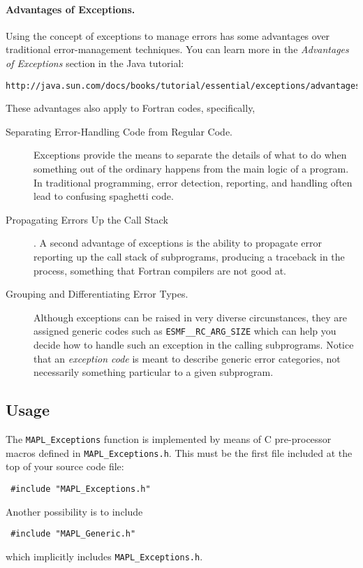\paragraph{Advantages of Exceptions.} Using the concept of exceptions
to manage errors has some advantages over traditional error-management
techniques. You can learn more in the {\em Advantages of Exceptions}
section in the Java tutorial:
\begin{verbatim}
http://java.sun.com/docs/books/tutorial/essential/exceptions/advantages.html
\end{verbatim}
These advantages also apply to Fortran codes, specifically,
\begin{description}

\item[Separating Error-Handling Code from Regular Code.] Exceptions
  provide the means to separate the details of what to do when
  something out of the ordinary happens from the main logic of a
  program. In traditional programming, error detection, reporting, and
  handling often lead to confusing spaghetti code.
  
\item[Propagating Errors Up the Call Stack].  A second advantage of
  exceptions is the ability to propagate error reporting up the call
  stack of subprograms, producing a traceback in the process,
  something that Fortran compilers are not good at.

\item[Grouping and Differentiating Error Types.] Although exceptions
  can be raised in very diverse circunstances, they are assigned
  generic codes such as {\tt ESMF\__RC\_ARG\_SIZE} which can help you
  decide how to handle such an exception in the calling
  subprograms. Notice that an {\em exception code} is meant to
  describe generic error categories, not necessarily something
  particular to a given subprogram.
\end{description}

\subsection*{Usage}

The {\tt MAPL\_Exceptions} function is implemented by means of C
pre-processor macros defined in {\tt MAPL\_Exceptions.h}. This must be
the first file included at the top of your source code file:
\begin{verbatim}
 #include "MAPL_Exceptions.h"
\end{verbatim}
Another possibility is to include
\begin{verbatim}
 #include "MAPL_Generic.h"
\end{verbatim}
which implicitly includes {\tt MAPL\_Exceptions.h}. 

